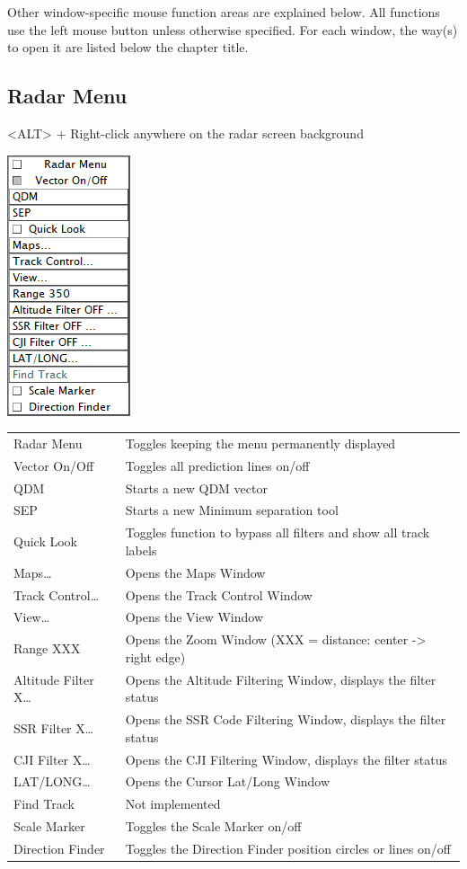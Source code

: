 \documentclass[11pt,a4paper]{memoir}
\begin{document}
Other window-specific mouse function areas are explained below. All functions use the left mouse button unless otherwise specified. For each window, the way(s) to open it are listed below the chapter title.

\subsection{Radar Menu}
\label{menu:radarm}
<ALT> + Right-click anywhere on the radar screen background

\includegraphics{img/radarmenu.png}

\begin{tabular}{l l}
    Radar Menu          & Toggles keeping the menu permanently displayed\\
    Vector On/Off       & Toggles all prediction lines on/off\\
    QDM                 & Starts a new QDM vector\\
    SEP                 & Starts a new Minimum separation tool\\
    Quick Look          & Toggles function to bypass all filters and show all track labels\\
    Maps…               & Opens the Maps Window\\
    Track Control…      & Opens the Track Control Window\\
    View…               & Opens the View Window\\
    Range XXX           & Opens the Zoom Window (XXX = distance: center -> right edge)\\
    Altitude Filter X…  & Opens the Altitude Filtering Window, displays the filter status\\
    SSR Filter X…       & Opens the SSR Code Filtering Window, displays the filter status\\
    CJI Filter X…       & Opens the CJI Filtering Window, displays the filter status\\
    LAT/LONG…           & Opens the Cursor Lat/Long Window\\
    Find Track          & Not implemented\\
    Scale Marker        & Toggles the Scale Marker on/off\\
    Direction Finder    & Toggles the Direction Finder position circles or lines on/off\\
\end{tabular}
\end{document}
